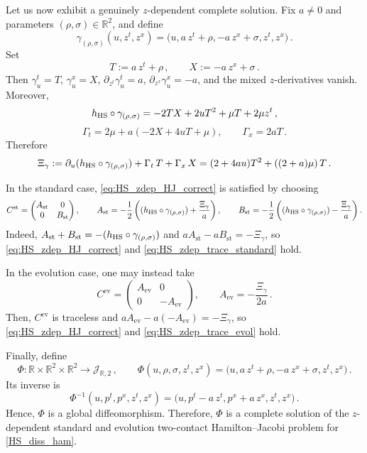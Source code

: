 \documentclass[11pt,twoside]{article}
\theoremstyle{plain}
\theoremstyle{definition}
\theoremstyle{remark}
\begin{document}
Let us now exhibit a genuinely $z$-dependent complete solution. Fix $a\neq0$ and parameters $(\rho,\sigma)\in\mathbb R^2$, and define
\begin{equation}\label{eq:HS_gamma_complete_family}
\gamma_{(\rho,\sigma)}(u,z^t,z^x)=\bigl(u,a\,z^t+\rho,-a\,z^x+\sigma,z^t,z^x\bigr)\,.
\end{equation}
Set
\[
T:=a\,z^t+\rho\,,\qquad X:=-a\,z^x+\sigma\,.
\]
Then $\gamma_u^t=T$, $\gamma_u^x=X$, $\partial_{z^t}\gamma_u^t=a$, $\partial_{z^x}\gamma_u^x=-a$, and the mixed $z$-derivatives vanish. Moreover,
\[
h_{\rm HS}\circ\gamma_{(\rho,\sigma)}=-2TX+2uT^2+\mu T+2\mu z^t\,,
\]
\[
\Gamma_t=2\mu+a(-2X+4uT+\mu),\qquad \Gamma_x=2aT\,.
\]
Therefore
\begin{equation}\label{eq:HS_Xi_gamma}
\Xi_\gamma:=\partial_u(h_{\rm HS}\circ\gamma_{(\rho,\sigma)})+\Gamma_t\,T+\Gamma_x\,X=(2+4au)T^2+((2+a)\mu)\,T\,.
\end{equation}

In the standard case, \eqref{eq:HS_zdep_HJ_correct} is satisfied by choosing
\begin{equation}\label{eq:HS_C_standard}
C^{\mathrm{st}}=
\begin{pmatrix}
A_{\mathrm{st}} & 0\\
0 & B_{\mathrm{st}}
\end{pmatrix},
\qquad
A_{\mathrm{st}}=-\frac12\left((h_{\rm HS}\circ\gamma_{(\rho,\sigma)})+\frac{\Xi_\gamma}{a}\right),
\qquad
B_{\mathrm{st}}=-\frac12\left((h_{\rm HS}\circ\gamma_{(\rho,\sigma)})-\frac{\Xi_\gamma}{a}\right).
\end{equation}
Indeed, $A_{\mathrm{st}}+B_{\mathrm{st}}=-(h_{\rm HS}\circ\gamma_{(\rho,\sigma)})$ and $aA_{\mathrm{st}}-aB_{\mathrm{st}}=-\Xi_\gamma$, so \eqref{eq:HS_zdep_HJ_correct} and \eqref{eq:HS_zdep_trace_standard} hold.

In the evolution case, one may instead take
\begin{equation}\label{eq:HS_C_evol}
C^{\mathrm{ev}}=
\begin{pmatrix}
A_{\mathrm{ev}} & 0\\
0 & -A_{\mathrm{ev}}
\end{pmatrix},
\qquad
A_{\mathrm{ev}}=-\frac{\Xi_\gamma}{2a}\,.
\end{equation}
Then, $C^{\mathrm{ev}}$ is traceless and $aA_{\mathrm{ev}}-a(-A_{\mathrm{ev}})=-\Xi_\gamma$, so \eqref{eq:HS_zdep_HJ_correct} and \eqref{eq:HS_zdep_trace_evol} hold.

Finally, define
\begin{equation}\label{eq:HS_complete_map}
\Phi\colon \mathbb R\times\mathbb R^2\times\mathbb R^2\to \mathcal J_{\mathbb R,2}\,,
\qquad
\Phi(u,\rho,\sigma,z^t,z^x)=\bigl(u,a\,z^t+\rho,-a\,z^x+\sigma,z^t,z^x\bigr)\,.
\end{equation}
Its inverse is
\begin{equation}\label{eq:HS_complete_inverse}
\Phi^{-1}(u,p^t,p^x,z^t,z^x)=\bigl(u,p^t-a\,z^t,p^x+a\,z^x,z^t,z^x\bigr)\,.
\end{equation}
Hence, $\Phi$ is a global diffeomorphism. Therefore, $\Phi$ is a complete solution of the $z$-dependent standard and evolution two-contact Hamilton--Jacobi problem for \eqref{HS_diss_ham}. 
\end{document}

